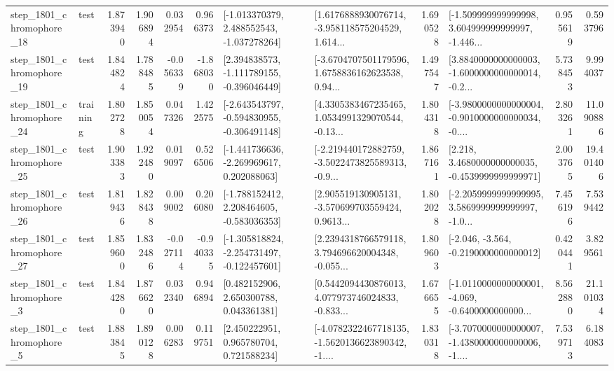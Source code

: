 \begin{tabular}{llrrrrllrlrr}
 step\_1801\_chromophore\_18 &      test &      1.873940 &    1.906894 &      0.032954 &  0.966373 &   [-1.013370379, 2.488552543, -1.037278264] &  [1.6176888930076714, -3.958118575204529, 1.614... &       1.690528 &  [-1.509999999999998, 3.604999999999997, -1.446... &            0.955619 &          0.593796 \\
 step\_1801\_chromophore\_19 &      test &      1.844824 &    1.788485 &     -0.056339 & -1.868030 &   [2.394838573, -1.111789155, -0.396046449] &  [-3.6704707501179596, 1.6758836162623538, 0.94... &       1.497547 &  [3.8840000000000003, -1.6000000000000014, -0.2... &            5.738453 &          9.994037 \\
 step\_1801\_chromophore\_24 &  training &      1.802728 &    1.850054 &      0.047326 &  1.422575 &  [-2.643543797, -0.594830955, -0.306491148] &  [4.3305383467235465, 1.0534991329070544, -0.13... &       1.804318 &  [-3.9800000000000004, -0.9010000000000034, -0.... &            2.803261 &         11.090886 \\
 step\_1801\_chromophore\_25 &      test &      1.903383 &    1.922480 &      0.019097 &  0.526506 &   [-1.441736636, -2.269969617, 0.202088063] &  [-2.219440172882759, -3.5022473825589313, -0.9... &       1.867161 &   [2.218, 3.4680000000000035, -0.4539999999999971] &            2.003765 &         19.401406 \\
 step\_1801\_chromophore\_26 &      test &      1.819436 &    1.828438 &      0.009002 &  0.206080 &   [-1.788152412, 2.208464605, -0.583036353] &  [2.905519130905131, -3.570699703559424, 0.9613... &       1.802028 &  [-2.2059999999999995, 3.5869999999999997, -1.0... &            7.456196 &          7.539442 \\
 step\_1801\_chromophore\_27 &      test &      1.859600 &    1.832486 &     -0.027114 & -0.940335 &  [-1.305818824, -2.254731497, -0.122457601] &  [2.2394318766579118, 3.794696620004348, -0.055... &       1.809603 &              [-2.046, -3.564, -0.2190000000000012] &            0.420441 &          3.829561 \\
  step\_1801\_chromophore\_3 &      test &      1.844280 &    1.876620 &      0.032340 &  0.946894 &     [0.482152906, 2.650300788, 0.043361381] &  [0.5442094430876013, 4.077973746024833, -0.833... &       1.676655 &  [-1.0110000000000001, -4.069, -0.6400000000000... &            8.562880 &         21.101034 \\
  step\_1801\_chromophore\_5 &      test &      1.883845 &    1.890128 &      0.006283 &  0.119751 &     [2.450222951, 0.965780704, 0.721588234] &  [-4.0782322467718135, -1.5620136623890342, -1.... &       1.830318 &  [-3.7070000000000007, -1.4380000000000006, -1.... &            7.539713 &          6.184083 \\

\end{tabular}
